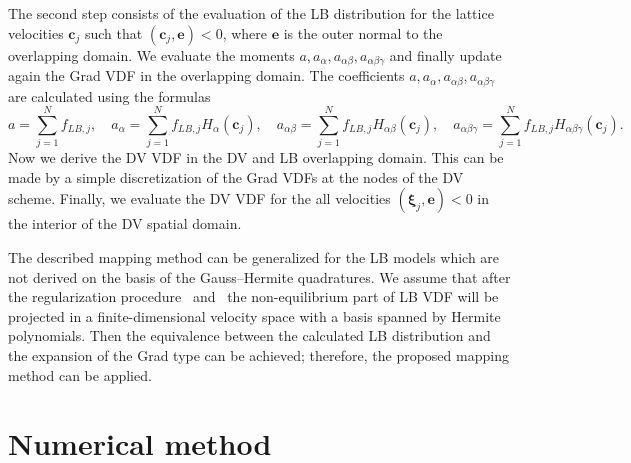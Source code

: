 \documentclass[]{elsarticle} %
\newcommand{\Set}[2]{\{\,{#1}:{#2}\,\}}
\newcommand{\bxi}{\boldsymbol{\xi}}
\newcommand{\bc}{\boldsymbol{c}}
\begin{document}
The second step consists of the evaluation of the LB   distribution for the lattice velocities $\boldsymbol{c}_j$ such that $(\boldsymbol{c}_j,\mathbf{e})<0$, where $\mathbf{e}$ is the outer normal to the overlapping domain.  We evaluate the moments $a,a_{\alpha},a_{\alpha\beta},
a_{\alpha\beta\gamma}$ and finally update again the Grad VDF in the overlapping domain. The coefficients $a,a_{\alpha},a_{\alpha\beta},
a_{\alpha\beta\gamma}$ are calculated using the formulas
$$
a=\sum_{j=1}^N f_{LB,j}, \quad a_{\alpha}=\sum_{j=1}^N f_{LB,j}H_{\alpha}(\bc_j), \quad a_{\alpha\beta}=\sum_{j=1}^N f_{LB,j}H_{\alpha\beta}(\bc_j),
\quad a_{\alpha\beta\gamma}=\sum_{j=1}^N f_{LB,j}H_{\alpha\beta\gamma}(\bc_j).
$$
Now we  derive the DV VDF in the DV and LB overlapping domain. This can be made by a simple
discretization of the Grad VDFs at the nodes of the DV scheme. Finally, we evaluate the DV VDF for the all velocities $(\bxi_j,\mathbf{e}) <0$
in the interior of the DV spatial domain.

The described mapping method can be generalized for the LB models which are not derived on the basis of the Gauss--Hermite quadratures.
We assume that after the regularization procedure~\cite{Latt2006, Chen2006} and~\cite{Zhang2006, Mont2015, Mattila2017}
the non-equilibrium part of LB VDF will be projected in a finite-dimensional velocity space with a basis spanned by Hermite polynomials.
Then the equivalence between the calculated LB distribution and
the expansion of the Grad type can be achieved; therefore, the proposed mapping method can be applied.

\section{Numerical method}\label{sec:numerics}


\end{document}
